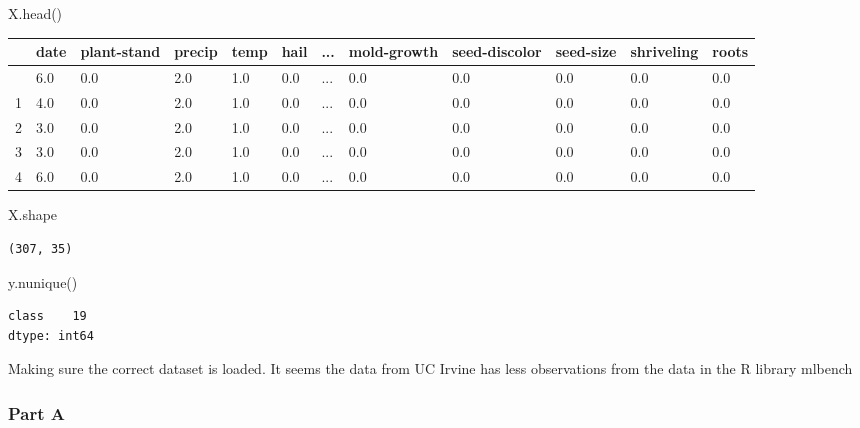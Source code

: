 \documentclass[
  11pt,
]{article}
\newenvironment{Shaded}{\begin{snugshade}}{\end{snugshade}}
\newcommand{\NormalTok}[1]{\textcolor[rgb]{0.00,0.23,0.31}{#1}}
\begin{document}
\begin{Shaded}
\begin{Highlighting}[]
\NormalTok{X.head()}
\end{Highlighting}
\end{Shaded}

\begin{longtable}[]{@{}llllllllllll@{}}
\toprule\noalign{}
& date & plant-stand & precip & temp & hail & ... & mold-growth &
seed-discolor & seed-size & shriveling & roots \\
\midrule\noalign{}
\endhead
\bottomrule\noalign{}
\endlastfoot
0 & 6.0 & 0.0 & 2.0 & 1.0 & 0.0 & ... & 0.0 & 0.0 & 0.0 & 0.0 & 0.0 \\
1 & 4.0 & 0.0 & 2.0 & 1.0 & 0.0 & ... & 0.0 & 0.0 & 0.0 & 0.0 & 0.0 \\
2 & 3.0 & 0.0 & 2.0 & 1.0 & 0.0 & ... & 0.0 & 0.0 & 0.0 & 0.0 & 0.0 \\
3 & 3.0 & 0.0 & 2.0 & 1.0 & 0.0 & ... & 0.0 & 0.0 & 0.0 & 0.0 & 0.0 \\
4 & 6.0 & 0.0 & 2.0 & 1.0 & 0.0 & ... & 0.0 & 0.0 & 0.0 & 0.0 & 0.0 \\
\end{longtable}

\begin{Shaded}
\begin{Highlighting}[]
\NormalTok{X.shape}
\end{Highlighting}
\end{Shaded}

\begin{verbatim}
(307, 35)
\end{verbatim}

\begin{Shaded}
\begin{Highlighting}[]
\NormalTok{y.nunique()}
\end{Highlighting}
\end{Shaded}

\begin{verbatim}
class    19
dtype: int64
\end{verbatim}

Making sure the correct dataset is loaded. It seems the data from UC
Irvine has less observations from the data in the R library mlbench

\subsubsection{Part A}\label{part-a-1}
\end{document}
